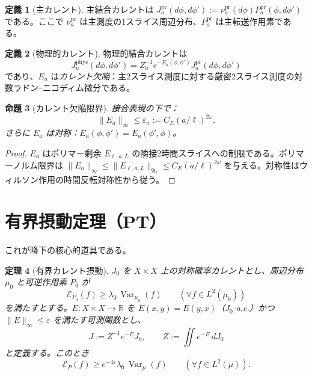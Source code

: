 \documentclass[12pt]{article}
\theoremstyle{plain}
\newtheorem{theorem}{定理}[section]
\newtheorem{proposition}[theorem]{命題}
\theoremstyle{definition}
\newtheorem{definition}[theorem]{定義}
\numberwithin{equation}{section}
\newcommand{\R}{\mathbb{R}}
\newcommand{\fA}{\mathfrak{A}}
\newcommand{\Var}{\operatorname{Var}}
\newcommand{\pr}{\mathrm{pr}}
\newcommand{\phys}{\mathrm{phys}}
\begin{document}
\begin{definition}[主カレント]
主結合カレントは $J_a^{\pr}(d\phi,d\phi'):=\nu_a^{\pr}(d\phi)P_a^{\pr}(\phi,d\phi')$ である。ここで $\nu_a^{\pr}$ は主測度の1スライス周辺分布、$P_a^{\pr}$ は主転送作用素である。
\end{definition}

\begin{definition}[物理的カレント]
物理的結合カレントは
\begin{equation}
J_a^{\phys}(d\phi,d\phi') = Z_a^{-1}e^{-E_a(\phi,\phi')}J_a^{\pr}(d\phi,d\phi')
\end{equation}
であり、$E_a$ は\emph{カレント欠陥}：主2スライス測度に対する厳密2スライス測度の対数ラドン--ニコディム微分である。
\end{definition}

\begin{proposition}[カレント欠陥限界]\label{prop:currentdefect}
接合表現の下で：
\begin{equation}
\|E_a\|_\infty \leq \varepsilon_a := C_E(a/\ell)^{2\omega}.
\end{equation}
さらに $E_a$ は対称：$E_a(\phi,\phi')=E_a(\phi',\phi)$。
\end{proposition}

\begin{proof}
$E_a$ はポリマー剰余 $E_{\ell,a,L}$ の隣接2時間スライスへの制限である。ポリマーノルム限界は $\|E_a\|_\infty\leq\|E_{\ell,a,L}\|_{\fA_\ell}\leq C_E(a/\ell)^{2\omega}$ を与える。対称性はウィルソン作用の時間反転対称性から従う。
\end{proof}

\section{有界摂動定理（PT）}\label{sec:PT}

これが降下の核心的道具である。

\begin{theorem}[有界カレント摂動]\label{thm:PT}
$J_0$ を $X\times X$ 上の対称確率カレントとし、周辺分布 $\mu_0$ と可逆作用素 $P_0$ が
\begin{equation}
\mathcal{E}_{P_0}(f) \geq \lambda_0\,\Var_{\mu_0}(f)\qquad(\forall f\in L^2(\mu_0))
\end{equation}
を満たすとする。$E:X\times X\to\R$ を $E(x,y)=E(y,x)$（$J_0$-a.e.）かつ $\|E\|_\infty\leq\varepsilon$ を満たす可測関数とし、
\begin{equation}
J := Z^{-1}e^{-E}J_0,\qquad Z:=\iint e^{-E}\,dJ_0
\end{equation}
と定義する。このとき
\begin{equation}
\boxed{\mathcal{E}_P(f) \geq e^{-4\varepsilon}\lambda_0\,\Var_\mu(f)\qquad(\forall f\in L^2(\mu)).}
\end{equation}
\end{theorem}
\end{document}
